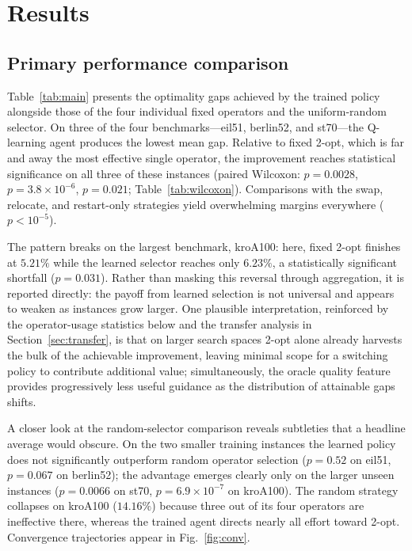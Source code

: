 \documentclass[10pt,twocolumn]{article}
\begin{document}
\section{Results}\label{sec:results}
\subsection{Primary performance comparison}
Table~\ref{tab:main} presents the optimality gaps achieved by the trained
policy alongside those of the four individual fixed operators and the
uniform-random selector. On three of the four benchmarks---eil51, berlin52, and
st70---the Q-learning agent produces the lowest mean gap. Relative to fixed
2-opt, which is far and away the most effective single operator, the
improvement reaches statistical significance on all three of these instances
(paired Wilcoxon: $p=0.0028$, $p=3.8\times10^{-6}$, $p=0.021$;
Table~\ref{tab:wilcoxon}). Comparisons with the swap, relocate, and
restart-only strategies yield overwhelming margins everywhere ($p<10^{-5}$).

The pattern breaks on the largest benchmark, kroA100: here, fixed 2-opt
finishes at $5.21\%$ while the learned selector reaches only $6.23\%$, a
statistically significant shortfall ($p=0.031$). Rather than masking this
reversal through aggregation, it is reported directly: the payoff from learned
selection is not universal and appears to weaken as instances grow larger. One
plausible interpretation, reinforced by the operator-usage statistics below and
the transfer analysis in Section~\ref{sec:transfer}, is that on larger search
spaces 2-opt alone already harvests the bulk of the achievable improvement,
leaving minimal scope for a switching policy to contribute additional value;
simultaneously, the oracle quality feature provides progressively less useful
guidance as the distribution of attainable gaps shifts.

A closer look at the random-selector comparison reveals subtleties that a
headline average would obscure. On the two smaller training instances the
learned policy does not significantly outperform random operator selection
($p=0.52$ on eil51, $p=0.067$ on berlin52); the advantage emerges clearly only
on the larger unseen instances ($p=0.0066$ on st70, $p=6.9\times10^{-7}$ on
kroA100). The random strategy collapses on kroA100 ($14.16\%$) because three
out of its four operators are ineffective there, whereas the trained agent
directs nearly all effort toward 2-opt. Convergence trajectories appear in
Fig.~\ref{fig:conv}.
\end{document}
